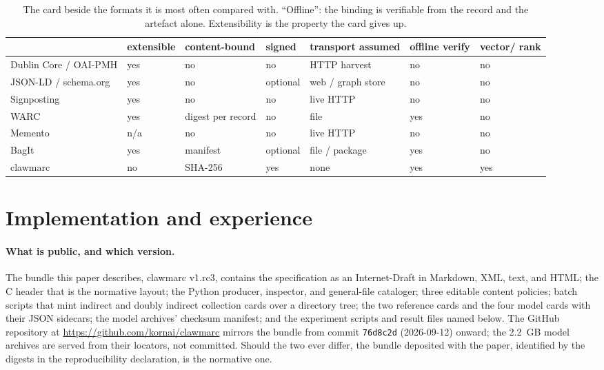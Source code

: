 \documentclass[11pt]{article}
\begin{document}
\begin{table}[t]
\centering
\caption{The card beside the formats it is most often compared with.
``Offline'': the binding is verifiable from the record and the artefact
alone. Extensibility is the property the card gives up.}
\label{tab:compare}
\small
\begin{tabular}{@{}lp{1.5cm}p{1.9cm}p{1.4cm}p{2.3cm}p{1.4cm}p{1.5cm}@{}}
\toprule
 & extensible & content-bound & signed & transport assumed & offline verify & vector/ rank \\
\midrule
Dublin Core / OAI-PMH & yes & no & no & HTTP harvest & no & no \\
JSON-LD / schema.org & yes & no & optional & web / graph store & no & no \\
Signposting & yes & no & no & live HTTP & no & no \\
WARC & yes & digest per record & no & file & yes & no \\
Memento & n/a & no & no & live HTTP & no & no \\
BagIt & yes & manifest & optional & file / package & yes & no \\
clawmarc & no & SHA-256 & yes & none & yes & yes \\
\bottomrule
\end{tabular}
\end{table}

\section{Implementation and experience}
\label{sec:impl}

\paragraph{What is public, and which version.} The bundle this paper
describes, clawmarc v1.rc3, contains the specification as an Internet-Draft
in Markdown, XML, text, and HTML; the C header that is the normative layout;
the Python producer, inspector, and general-file cataloger; three editable
content policies; batch scripts that mint indirect and doubly indirect
collection cards over a directory tree; the two reference cards and the four
model cards with their JSON sidecars; the model archives' checksum manifest;
and the experiment scripts and result files named below. The GitHub
repository at \url{https://github.com/kornai/clawmarc} mirrors the bundle
from commit \texttt{76d8c2d} (2026-09-12) onward; the 2.2~GB model archives
are served from their locators, not committed. Should the two ever differ, the bundle
deposited with the paper, identified by the digests in the reproducibility
declaration, is the normative one.
\end{document}
